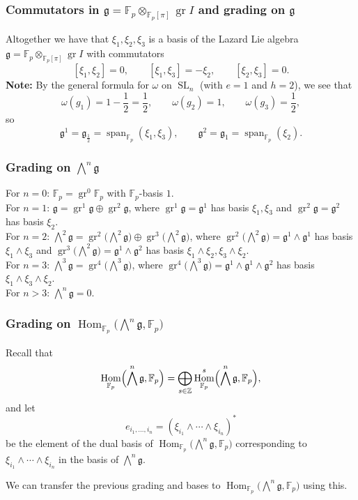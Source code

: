 \documentclass{beamer}
\newcommand*\Z{\mathbb{Z}}
\newcommand*\F{\mathbb{F}}
\DeclareMathOperator\Span{span}
\DeclareMathOperator{\SL}{SL} %
\DeclareMathOperator{\Hom}{Hom} %
\DeclareMathOperator{\gr}{gr} %
\newcommand*{\lie}[1]{\mathfrak{#1}} %
\begin{document}
\begin{frame}
  \frametitle{Commutators in $\lie{g} = \F_{p} \otimes_{\F_{p}[\pi]} \gr I$ and grading on $\lie{g}$}

  Altogether we have that $\xi_{1},\xi_{2},\xi_{3}$ is a basis of the Lazard Lie algebra $\lie{g} = \F_{p} \otimes_{\F_{p}[\pi]} \gr I$ with commutators
  \[
    [\xi_{1},\xi_{2}] = 0, \qquad [\xi_{1},\xi_{3}] = -\xi_{2}, \qquad [\xi_{2},\xi_{3}] = 0.
  \]
  \pause
  \textbf{Note:} By the general formula for $\omega$ on $\SL_{n}$ (with $e=1$ and $h=2$), we see that
  \[
    \omega(g_{1}) = 1-\frac{1}{2} = \frac{1}{2}, \qquad \omega(g_{2})=1, \qquad \omega(g_{3}) = \frac{1}{2},
  \]
  so
  \[
    \lie{g}^{1} = \lie{g}_{\frac{1}{2}} = \Span_{\F_{p}}(\xi_{1},\xi_{3}), \qquad \lie{g}^{2}=\lie{g}_{1}=\Span_{\F_{p}}(\xi_{2}).
  \]
\end{frame}

\begin{frame}
  \frametitle{Grading on $\bigwedge^{n} \lie{g}$}

  For $n=0$: $\F_{p} = \gr^{0} \F_{p}$ with $\F_{p}$-basis $1$. \\[1em]

  For $n=1$: $\lie{g} = \gr^{1} \lie{g} \oplus \gr^{2} \lie{g}$, where $\gr^{1} \lie{g} = \lie{g}^{1}$ has basis $\xi_{1},\xi_{3}$ and $\gr^{2} \lie{g} = \lie{g}^{2}$ has basis $\xi_{2}$. \\[1em]

  For $n=2$: $\bigwedge^{2} \lie{g} = \gr^{2} \bigl( \bigwedge^{2} \lie{g} \bigr) \oplus \gr^{3} \bigl( \bigwedge^{2} \lie{g} \bigr)$, where $\gr^{2} \bigl( \bigwedge^{2} \lie{g} \bigr) = \lie{g}^{1} \wedge \lie{g}^{1}$ has basis $\xi_{1}\wedge\xi_{3}$ and $\gr^{3} \bigl( \bigwedge^{2}\lie{g} \bigr) = \lie{g}^{1} \wedge \lie{g}^{2}$ has basis $\xi_{1}\wedge \xi_{2},\xi_{3}\wedge\xi_{2}$. \\[1em]

  For $n=3$: $\bigwedge^{3} \lie{g} = \gr^{4} \bigl( \bigwedge^{3} \lie{g} \bigr)$, where $\gr^{4} \bigl( \bigwedge^{3} \lie{g} \bigr) = \lie{g}^{1} \wedge \lie{g}^{1} \wedge \lie{g}^{2}$ has basis $\xi_{1}\wedge\xi_{3}\wedge \xi_{2}$. \\[1em]

  For $n>3$: $\bigwedge^{n} \lie{g} = 0$.
\end{frame}

\begin{frame}
  \frametitle{Grading on $\Hom_{\F_{p}}\bigl( \bigwedge^{n}\lie{g},\F_{p} \bigr)$}

  Recall that
  \[
    \Hom_{\F_{p}} \Bigl( \bigwedge^{n}\lie{g}, \F_{p} \Bigr) = \bigoplus_{s \in \Z} \Hom_{\F_{p}}^{s}\Bigl( \bigwedge^{n}\lie{g}, \F_{p} \Bigr),
  \]
  and let
  \[
    e_{i_{1},\dotsc,i_{n}} = (\xi_{i_{1}} \wedge \dotsb \wedge \xi_{i_{n}})^{*}
  \]
  be the element of the dual basis of $\Hom_{\F_{p}}\bigl( \bigwedge^{n}\lie{g},\F_{p}  \bigr)$ corresponding to $\xi_{i_{1}} \wedge \dotsb \wedge \xi_{i_{n}}$ in the basis of $\bigwedge^{n} \lie{g}$. \pause

  We can transfer the previous grading and bases to $\Hom_{\F_{p}}\bigl( \bigwedge^{n}\lie{g},\F_{p} \bigr)$ using this.
\end{frame}
\end{document}
